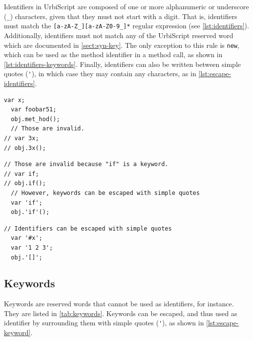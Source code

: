 \documentclass[openright,twoside,12pt]{report}
\newcommand{\us}{UrbiScript\xspace}
\newcommand{\lst}[1]{\autoref{lst:#1}}
\newcommand{\sect}[1]{\autoref{sect:#1}}
\newcommand{\tab}[1]{\autoref{tab:#1}}
\begin{document}
Identifiers in \us are composed of one or more alphanumeric or
underscore (\lstinline|_|) characters, given that they must not start
with a digit. That is, identifiers must match the
\lstinline|[a-zA-Z_][a-zA-Z0-9_]*| regular expression (see
\lst{identifiers}).  Additionally, identifiers must not match any of
the \us reserved word which are documented in \sect{syn-key}. The only
exception to this rule is \lstinline|new|, which can be used as the
method identifier in a method call, as shown in
\lst{identifiers-keywords}.  Finally, identifiers can also be written
between simple quotes (\lstinline|'|), in which case they may contain
any characters, as in \lst{escape-identifiers}.

\begin{lstlisting}[caption=Identifiers,label=lst:identifiers,float=htp]
  var x;
  var foobar51;
  obj.met_hod();
  // Those are invalid.
// var 3x;
// obj.3x();
\end{lstlisting}

\begin{lstlisting}[caption=Identifiers cannot be keywords,
  label=lst:identifiers-keywords,float=htp]
  // Those are invalid because "if" is a keyword.
// var if;
// obj.if();
  // However, keywords can be escaped with simple quotes
  var 'if';
  obj.'if'();
\end{lstlisting}

\begin{lstlisting}[caption=Escaping identifiers with simple quotes,
  label=lst:escape-identifiers,float=htp]
  // Identifiers can be escaped with simple quotes
  var '#x';
  var '1 2 3';
  obj.'[]';
\end{lstlisting}

\subsection{Keywords}
\label{sect:syn-key}

Keywords are reserved words that cannot be used as identifiers, for
instance.  They are listed in \tab{keywords}.  Keywords can be
escaped, and thus used as identifier by surrounding them with simple
quotes (\lstinline|'|), as shown in \lst{escape-keyword}.
\end{document}
